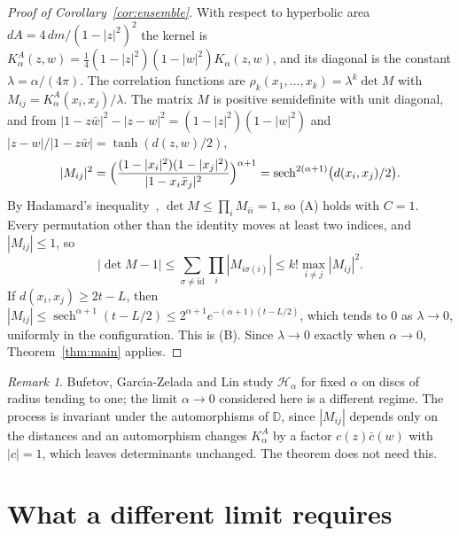 \documentclass[11pt]{amsart}
\theoremstyle{definition}
\theoremstyle{remark}
\newtheorem{remark}[theorem]{Remark}
\newcommand{\D}{\mathbb{D}}
\newcommand{\area}{A}
\begin{document}
\begin{proof}[Proof of Corollary~\ref{cor:ensemble}]
With respect to hyperbolic area $d\area=4\,dm/(1-|z|^2)^2$ the kernel is
$K^\area_\alpha(z,w)=\tfrac14(1-|z|^2)(1-|w|^2)K_\alpha(z,w)$, and its diagonal is the constant $\lambda=\alpha/(4\pi)$.
The correlation functions are $\rho_k(x_1,\dots,x_k)=\lambda^k\det M$ with $M_{ij}=K^\area_\alpha(x_i,x_j)/\lambda$. The
matrix $M$ is positive semidefinite with unit diagonal, and from
$|1-z\bar w|^2-|z-w|^2=(1-|z|^2)(1-|w|^2)$ and $|z-w|/|1-z\bar w|=\tanh(d(z,w)/2)$,
\[
  |M_{ij}|^2=\Bigl(\frac{(1-|x_i|^2)(1-|x_j|^2)}{|1-x_i\bar x_j|^2}\Bigr)^{\alpha+1}
  =\operatorname{sech}^{2(\alpha+1)}\bigl(d(x_i,x_j)/2\bigr).
\]
By Hadamard's inequality~\cite[Theorem~7.8.1, p.~505]{HJ13}, $\det M\le\prod_iM_{ii}=1$, so (A) holds with $C=1$. Every
permutation other than the identity moves at least two indices, and $|M_{ij}|\le1$, so
\[
  |\det M-1|\le\sum_{\sigma\ne\mathrm{id}}\prod_i|M_{i\sigma(i)}|\le k!\max_{i\ne j}|M_{ij}|^2.
\]
If $d(x_i,x_j)\ge2t-L$, then $|M_{ij}|\le\operatorname{sech}^{\alpha+1}(t-L/2)\le2^{\alpha+1}e^{-(\alpha+1)(t-L/2)}$, which
tends to $0$ as $\lambda\to0$, uniformly in the configuration. This is (B). Since $\lambda\to0$ exactly when $\alpha\to0$,
Theorem~\ref{thm:main} applies.
\end{proof}

\begin{remark}
Bufetov, Garc\'{\i}a-Zelada and Lin study $\mathcal H_\alpha$ for fixed $\alpha$ on discs of radius tending to one; the
limit $\alpha\to0$ considered here is a different regime. The process is invariant under the automorphisms of $\D$,
since $|M_{ij}|$ depends only on the distances and an automorphism changes $K^\area_\alpha$ by a factor
$c(z)\bar c(w)$ with $|c|=1$, which leaves determinants unchanged. The theorem does not need this.
\end{remark}

\section{What a different limit requires}\label{sec:needs}
\end{document}
